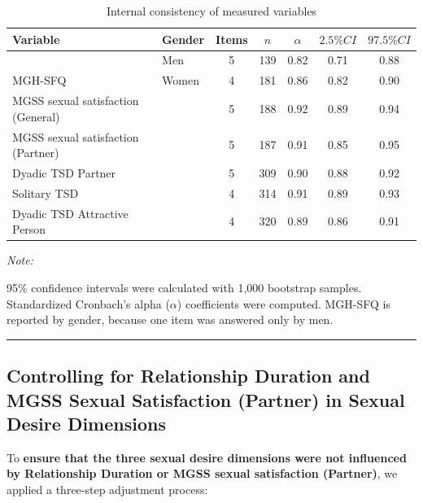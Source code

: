 \documentclass[
  bookmarksnumbered]{article}
\begin{document}
\begin{table}[H]
\centering
\caption{\label{tab:Cronbach-tab}Internal consistency of measured variables}
\centering
\begin{threeparttable}
\begin{tabular}[t]{llccccc}
\toprule
Variable & Gender & Items & $n$ & $\alpha$ & $2.5\% CI$ & $97.5\% CI$\\
\midrule
 & Men & 5 & 139 & 0.82 & 0.71 & 0.88\\
\cmidrule{2-7}
\multirow{-2}{*}{\raggedright\arraybackslash MGH-SFQ} & Women & 4 & 181 & 0.86 & 0.82 & 0.90\\
\cmidrule{1-7}
MGSS sexual satisfaction (General) &  & 5 & 188 & 0.92 & 0.89 & 0.94\\
\cmidrule{1-7}
MGSS sexual satisfaction (Partner) &  & 5 & 187 & 0.91 & 0.85 & 0.95\\
\cmidrule{1-7}
Dyadic TSD Partner &  & 5 & 309 & 0.90 & 0.88 & 0.92\\
\cmidrule{1-7}
Solitary TSD &  & 4 & 314 & 0.91 & 0.89 & 0.93\\
\cmidrule{1-7}
Dyadic TSD Attractive Person &  & 4 & 320 & 0.89 & 0.86 & 0.91\\
\bottomrule
\end{tabular}
\begin{tablenotes}[para]
\item \textit{Note: } 
\item 95\% confidence intervals were calculated with 1,000 bootstrap samples.
           Standardized Cronbach's alpha ($\alpha$) coefficients were computed.
           MGH-SFQ is reported by gender, because one item was answered only by men.
\end{tablenotes}
\end{threeparttable}
\end{table}

\begin{center}\rule{0.5\linewidth}{0.5pt}\end{center}

\subsection{Controlling for Relationship Duration and MGSS Sexual Satisfaction (Partner) in Sexual Desire Dimensions}\label{controlling-for-relationship-duration-and-mgss-sexual-satisfaction-partner-in-sexual-desire-dimensions}

To \textbf{ensure that the three sexual desire dimensions were not influenced by Relationship Duration or MGSS sexual satisfaction (Partner)}, we applied a three-step adjustment process:
\end{document}
